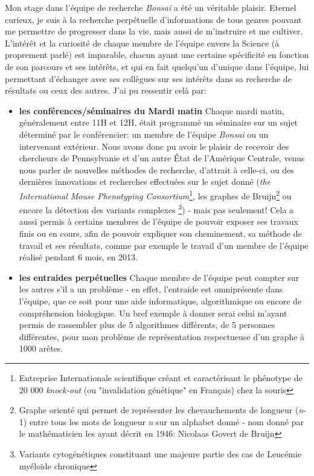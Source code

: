 \documentclass[pdftex,12pt,a4paper]{report}
\begin{document}
\begin{spacing}{1.2}
Mon stage dans l'équipe de recherche \textit{Bonsai} a été un véritable plaisir.
\newline
Eternel curieux, je suis à la recherche perpétuelle d'informations de tous genres pouvant me permettre de progresser dans la vie, mais aussi de m'instruire et me cultiver. L'intérêt et la curiosité de chaque membre de l'équipe envers la Science (à proprement parlé) est imparable, chacun ayant une certaine spécificité en fonction de son parcours et ses intérêts, et qui en fait quelqu'un d'unique dans l'équipe, lui permettant d'échanger avec ses collègues sur ses intérêts dans sa recherche de résultats ou ceux des autres.
\newline
J'ai pu ressentir celà par:
\begin{itemize}
\item \textbf{les conférences/séminaires du Mardi matin}
	\newline
	Chaque mardi matin, généralement entre 11H et 12H, était programmé un séminaire sur un sujet déterminé par le conférencier: un membre de l'équipe \textit{Bonsai} ou un intervenant extérieur.
	\newline
	Nous avons donc pu avoir le plaisir de recevoir des chercheurs de Pennsylvanie et d'un autre État de l'Amérique Centrale, venus nous parler de nouvelles méthodes de recherche, d'attrait à celle-ci, ou des dernières innovations et recherches effectuées sur le sujet donné (\textit{the International Mouse Phenotyping Consortium}\footnote{Entreprise Internationale scientifique créant et caractérisant le phénotype de 20 000 \textit{knock-out} (ou "invalidation génétique" en Français) chez la souris}, les graphes de Bruijn\footnote{Graphe orienté qui permet de représenter les chevauchements de longueur (\textit{n}-1) entre tous les mots de longueur \textit{n} sur un alphabet donné - nom donné par le mathématicien les ayant décrit en 1946: Nicolaas Govert de Bruijn} ou encore la détection des variants complexes \footnote{Variants cytogénétiques constituant une majeure partie des cas de Leucémie myéloïde chronique}) -  mais pas seulement!
	\newline
	Cela a aussi permis à certains membres de l'équipe de pouvoir exposer ses travaux finis ou en cours, afin de pouvoir expliquer son cheminement, sa méthode de travail et ses résultats, comme par exemple le travail d'un membre de l'équipe réalisé pendant 6 mois, en 2013.
\item \textbf{les entraides perpétuelles}
	\newline
	Chaque membre de l'équipe peut compter sur les autres s'il a un problème - en effet, l'entraide est omniprésente dans l'équipe, que ce soit pour une aide informatique, algorithmique ou encore de compréhension biologique. Un bref exemple à donner serai celui m'ayant permis de rassembler plus de 5 algorithmes différents, de 5 personnes différentes, pour mon problème de représentation respectueuse d'un graphe à 1000 arêtes.

\end{itemize}
\end{spacing}
\end{document}

